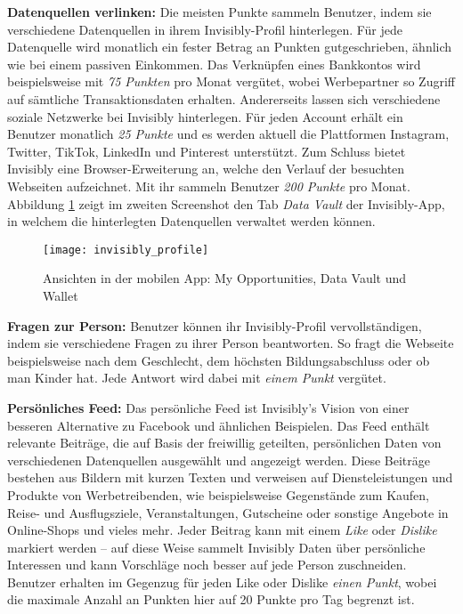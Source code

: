 \noindent \textbf{Datenquellen verlinken:} Die meisten Punkte sammeln Benutzer, indem sie verschiedene Datenquellen in ihrem Invisibly-Profil hinterlegen. Für jede Datenquelle wird monatlich ein fester Betrag an Punkten gutgeschrieben, ähnlich wie bei einem passiven Einkommen. \cite{pymntsInvisibly_2021} Das Verknüpfen eines Bankkontos wird beispielsweise mit \textit{75 Punkten} pro Monat vergütet, wobei Werbepartner so Zugriff auf sämtliche Transaktionsdaten erhalten. Andererseits lassen sich verschiedene soziale Netzwerke bei Invisibly hinterlegen. Für jeden Account erhält ein Benutzer monatlich \textit{25 Punkte} und es werden aktuell die Plattformen Instagram, Twitter, TikTok, LinkedIn und Pinterest unterstützt. Zum Schluss bietet Invisibly eine Browser-Erweiterung an, welche den Verlauf der besuchten Webseiten aufzeichnet. Mit ihr sammeln Benutzer \textit{200 Punkte} pro Monat. \cite{instagramInvisibly_2021, lifewireInvisibly_2021} Abbildung \ref{fig:invisiblyProfile} zeigt im zweiten Screenshot den Tab \textit{Data Vault} der Invisibly-App, in welchem die hinterlegten Datenquellen verwaltet werden können. \newline

\begin{figure}[!ht]
	\centering
	\texttt{[image: invisibly\_profile]}
	\caption{Ansichten in der mobilen App: My Opportunities, Data Vault und Wallet}
	\label{fig:invisiblyProfile}
\end{figure}

\noindent \textbf{Fragen zur Person:} Benutzer können ihr Invisibly-Profil vervollständigen, indem sie verschiedene Fragen zu ihrer Person beantworten. So fragt die Webseite beispielsweise nach dem Geschlecht, dem höchsten Bildungsabschluss oder ob man Kinder hat. Jede Antwort wird dabei mit \textit{einem Punkt} vergütet. \cite{instagramInvisibly_2021} \newline

\noindent \textbf{Persönliches Feed:} Das persönliche Feed ist Invisibly's Vision von einer besseren Alternative zu Facebook und ähnlichen Beispielen. Das Feed enthält relevante Beiträge, die auf Basis der freiwillig geteilten, persönlichen Daten von verschiedenen Datenquellen ausgewählt und angezeigt werden. Diese Beiträge bestehen aus Bildern mit kurzen Texten und verweisen auf Diensteleistungen und Produkte von Werbetreibenden, wie beispielsweise Gegenstände zum Kaufen, Reise- und Ausflugsziele, Veranstaltungen, Gutscheine oder sonstige Angebote in Online-Shops und vieles mehr. Jeder Beitrag kann mit einem \textit{Like} oder \textit{Dislike} markiert werden -- auf diese Weise sammelt Invisibly Daten über persönliche Interessen und kann Vorschläge noch besser auf jede Person zuschneiden. Benutzer erhalten im Gegenzug für jeden Like oder Dislike \textit{einen Punkt}, wobei die maximale Anzahl an Punkten hier auf 20 Punkte pro Tag begrenzt ist. \cite{invisiblyWhyPay_2021} \newline


